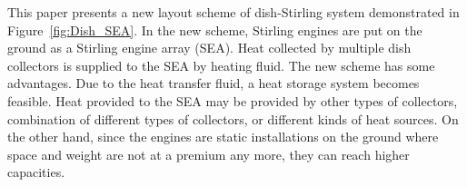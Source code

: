 \documentclass[review,3p,10t]{elsarticle}
\begin{document}
This paper presents a new layout scheme of dish-Stirling system demonstrated in Figure~\ref{fig:Dish_SEA}. In the new scheme, Stirling engines are put on the ground as a Stirling engine array (SEA). Heat collected by multiple dish collectors
 is supplied to the SEA by heating fluid. The new scheme has some advantages. Due to the heat transfer fluid, a heat storage system becomes feasible. Heat provided to the SEA may be provided by other types of collectors, combination of different types of collectors, or different kinds of heat sources. On the other hand, since the engines are static installations on the ground where space and weight are not at a premium any more, they can reach higher capacities.



\end{document}
